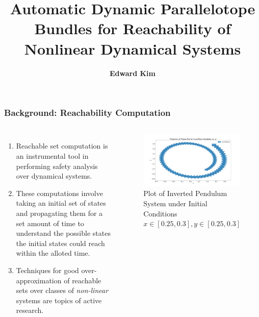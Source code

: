 \documentclass{beamer}
\title{\textbf{Automatic Dynamic Parallelotope Bundles for Reachability of Nonlinear Dynamical Systems}}
\author{\textbf{Edward Kim}\inst{1}}
\institute{\inst{1}University of North Carolina at Chapel Hill}
\begin{document}
\begin{frame}
\titlepage
\end{frame}




\begin{frame}
  \frametitle{\textbf{Background:} Reachability Computation}
  \begin{columns}
      \footnotesize
        \begin{enumerate}
          \item Reachable set computation is an instrumental tool in performing safety analysis over dynamical systems.
          \item These computations involve taking an initial set of states and propagating them for a set amount of time to understand the possible states the initial states could reach within the alloted time.
          \item Techniques for good over-approximation of reachable sets over classes of \emph{non-linear} systems are topics of active research.
        \end{enumerate}
        \hspace{3em}
        \begin{figure}
            \includegraphics[width=1.13\textwidth]{InvertPend}
            \caption{Plot of Inverted Pendulum System under Initial Conditions $x \in [0.25, 0.3], y \in [0.25, 0.3]$}
          \end{figure}
\end{columns}
\end{frame}
\end{document}
